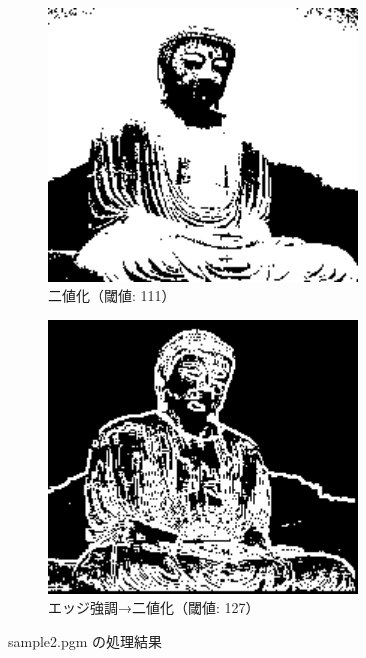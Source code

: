 \documentclass[a4paper,12pt]{jsarticle}
\begin{document}
\begin{figure}[!htbp]
\begin{subfigure}[b]{0.45\textwidth}
    \centering
    \includegraphics[width=0.9\textwidth]{./images/binarized_sample2_binary.png}
    \caption{二値化（閾値: 111）}
\end{subfigure}
\hfill
\begin{subfigure}[b]{0.45\textwidth}
    \centering
    \includegraphics[width=0.9\textwidth]{./images/combined_sample2_combined.png}
    \caption{エッジ強調→二値化（閾値: 127）}
\end{subfigure}
\caption{sample2.pgm の処理結果}
\label{fig:sample2}
\end{figure}
\end{document}
